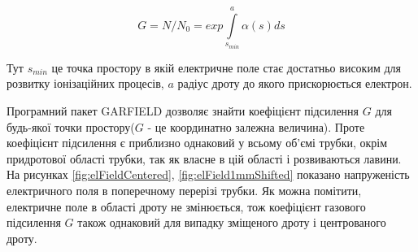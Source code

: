 \documentclass[pdftex,14pt]{scrartcl}
\begin{document}
	
	\begin{equation}
	G = N/N_0 = exp \int\limits_{s_{min}}^{a} \alpha(s) ds
	\label{eq:gain}
	\end{equation}
	
	Тут 	$s_{min}$ це точка простору в якій електричне поле стає достатньо високим для розвитку іонізаційних процесів, $a$ радіус дроту до якого прискорюється електрон.
	
	Програмний пакет GARFIELD дозволяє знайти коефіцієнт підсилення $G$ для будь-якої точки простору($G$ - це координатно залежна величина). Проте коефіцієнт підсилення є приблизно однаковий у всьому об’ємі трубки, окрім придротової області трубки, так як власне в цій області і розвиваються лавини. На рисунках \ref{fig:elFieldCentered}, \ref{fig:elField1mmShifted} показано напруженість електричного поля в поперечному перерізі трубки. Як можна помітити, електричне поле в області дроту не змінюється, тож коефіцієнт газового підсилення $G$ також однаковий для випадку зміщеного дроту і центрованого дроту. 
	
	
\end{document}

